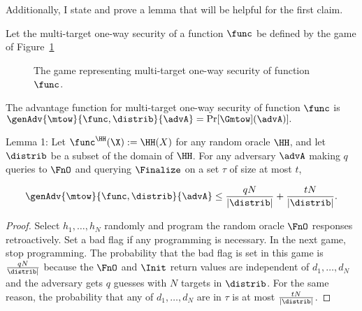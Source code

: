 Additionally, I state and prove a lemma that will be helpful for the first claim.

Let the multi-target one-way security of a function $\func$ be defined by the game of Figure~\ref{fig-game-mt-ow}

\begin{figure}
	\vspace{5pt}
	\caption{The game representing multi-target one-way security of function $\func$.}
	\label{fig-game-mt-ow}
\end{figure}

The advantage function for multi-target one-way security of function $\func$ is $\genAdv{\mtow}{\func, \distrib}{\advA} = \Pr[\Gmtow](\advA)].$ 

Lemma 1: Let $\func^{\HH}(\X) := \HH(X)$ for any random oracle $\HH$, and let $\distrib$ be a subset of the domain of $\HH$. For any adversary $\advA$ making $q$ queries to $\FnO$ and querying $\Finalize$ on a set $\tau$ of size at most $t$,

\[\genAdv{\mtow}{\func, \distrib}{\advA} \leq \frac{qN}{|\distrib|} + \frac{tN}{|\distrib|}.\]

\begin{proof}
Select $h_1, \ldots, h_N$ randomly and program the random oracle $\FnO$ responses retroactively. Set a bad flag if any programming is necessary. In the next game, stop programming. The probability that the bad flag is set in this game is $\frac{qN}{\distrib|}$ because the $\FnO$ and $\Init$ return values are independent of $d_1, \ldots, d_N$ and the adversary gets $q$ guesses with $N$ targets in $\distrib$. For the same reason, the probability that any of $d_1, \ldots, d_N$ are in $\tau$ is at most $\frac{tN}{|\distrib|}$. 
\end{proof}

